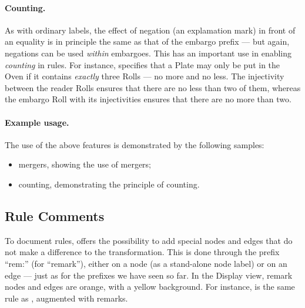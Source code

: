 
\paragraph{Counting.}

As with ordinary labels, the effect of negation (an explamation mark) in front
of an equality is in principle the same as
that of the embargo prefix --- but again, negations can be used \emph{within}
embargoes. This has an important use in enabling \emph{counting} in rules. For
instance,  specifies that a \textsf{Plate} may only be put in
the \textsf{Oven} if it contains \emph{exactly} three \textsf{Roll}s --- no
more and no less. The injectivity between the reader \textsf{Roll}s ensures
that there are no less than two of them, whereas the embargo \textsf{Roll} with
its injectivities ensures that there are no more than two.


\paragraph{Example usage.}

The use of the above features is demonstrated by the following \Groove samples:
%
\begin{itemize}\noitemsep
\item \textsf{mergers}, showing the use of mergers;
\item \textsf{counting}, demonstrating the principle of counting.
\end{itemize}

\subsection{Rule Comments}

To document rules, \Groove{} offers the possibility to add special nodes and
edges that do not make a difference to the transformation. This is done through
the prefix ``\textsf{rem:}'' (for ``remark''), either on a node (as a
stand-alone node label) or on an edge --- just as for the prefixes we have seen
so far. In the Display view, remark nodes and edges are orange, with a yellow
background. For instance,  is the same rule as ,
augmented with remarks.

